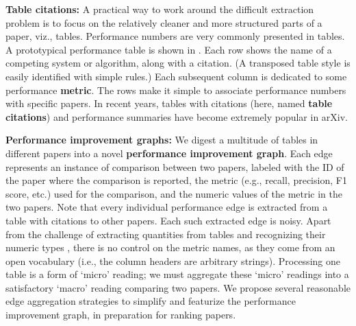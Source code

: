 \documentclass[runningheads]{llncs}
\begin{document}
\noindent \textbf{Table citations:}
A practical way to work around the difficult extraction problem is to focus on the relatively cleaner and more structured parts of a paper, viz., tables.  Performance numbers are very commonly presented in tables.  A prototypical performance table is shown in \citet[Figure~\ref{fig:CompTable}]{SinghSVGMC2019TabCite}.  Each row shows the name of a competing system or algorithm, along with a citation.  (A transposed table style is easily identified with simple rules.)  Each subsequent column is dedicated to some performance \textbf{metric}.  The rows make it simple to associate performance numbers with specific papers.  In recent years, tables with citations (here, named \textbf{table citations}) and performance summaries have become extremely popular in arXiv.


\noindent \textbf{Performance improvement graphs:}
We digest a multitude of tables in different papers into a novel \textbf{performance improvement graph}.  Each edge represents an instance of comparison between two papers, labeled with the ID of the paper where the comparison is reported, the metric (e.g., recall, precision, F1 score, etc.) used for the comparison, and the numeric values of the metric in the two papers. Note that every individual performance edge is extracted from a table with citations to other papers.  Each such extracted edge is noisy.  Apart from the challenge of extracting quantities from tables and recognizing their numeric types \cite{CafarellaHWWZ2008WebTables2,SarawagiC2014QEWT}, there is no control on the metric names, as they come from an open vocabulary (i.e., the column headers are arbitrary strings).  Processing one table is a form of `micro' reading; we must aggregate these `micro' readings into a satisfactory `macro' reading comparing two papers.  We propose several reasonable edge aggregation strategies to simplify and featurize the performance improvement graph, in preparation for ranking papers.
\end{document}
